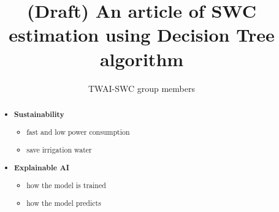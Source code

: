 \documentclass[twocolumn,3p,authoryear]{elsarticle}
\begin{document}
\begin{frontmatter}

    
    
    \author[1]{TWAI-SWC group members} %
    
    \title{(Draft) An article of SWC estimation using Decision Tree algorithm }
    
    
    \begin{abstract}
        \begin{itemize}
            \item \textbf{Sustainability}
                  \begin{itemize}
                      \item fast and low power consumption
                      \item save irrigation water
                  \end{itemize}
                  
            \item \textbf{Explainable AI}
                  \begin{itemize}
                      \item how the model is trained
                      \item how the model predicts
                  \end{itemize}
                  

\end{itemize}
\end{abstract}
\end{frontmatter}
\end{document}
